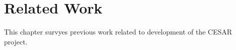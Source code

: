 \chapter{Related Work}
This chapter survyes previous work related to development of the CESAR project. 



%



